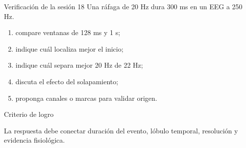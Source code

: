 \documentclass[
  10pt,
  ignorenonframetext,
  aspectratio=169,
  spanish,
]{beamer}
\providecommand{\tightlist}{%
  \setlength{\itemsep}{0pt}\setlength{\parskip}{0pt}}
\begin{document}
\begin{frame}{Verificación de la sesión 18}
\label{d2-128}
Una ráfaga de 20 Hz dura 300 ms en un EEG a 250 Hz.

\begin{enumerate}
\tightlist
\item
  compare ventanas de 128 ms y 1 s;
\item
  indique cuál localiza mejor el inicio;
\item
  indique cuál separa mejor 20 Hz de 22 Hz;
\item
  discuta el efecto del solapamiento;
\item
  proponga canales o marcas para validar origen.
\end{enumerate}

\begin{block}{Criterio de logro}

La respuesta debe conectar duración del evento, lóbulo temporal,
resolución y evidencia fisiológica.

\end{block}

\end{frame}
\end{document}
